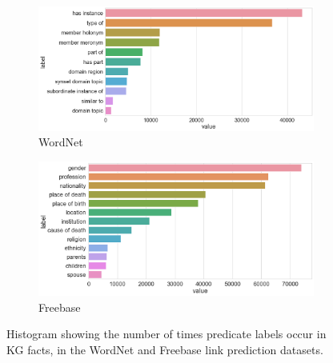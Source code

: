 \begin{figure}
	\begin{subfigure}[b]{.5\linewidth}
   		\centering
    		\includegraphics[width=1.0\linewidth, height=0.6\linewidth]{Wordnet_Predicate_Counts}
		\captionsetup{justification=centering}
		\caption{WordNet}
	\end{subfigure}
	\begin{subfigure}[b]{.5\linewidth}
   		\centering
		\includegraphics[width=1.0\linewidth, height=0.6\linewidth]{Freebase_Predicate_Counts}
		\captionsetup{justification=centering}
		\caption{Freebase}
	\end{subfigure}
	\captionsetup{justification=centering}
	\caption{Histogram showing the number of times predicate labels occur in KG facts, in the WordNet and Freebase link prediction datasets.}
\end{figure}



